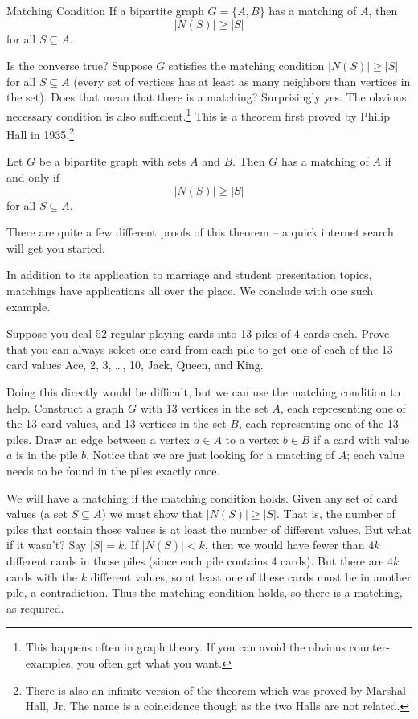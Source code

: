 \documentclass[12pt]{article}
\begin{document}
\begin{defbox}{Matching Condition}
If a bipartite graph $G = \{A, B\}$ has a matching of $A$, then 
\[|N(S)| \ge |S|\]
for all $S \subseteq A$.
\end{defbox}

Is the converse true?  Suppose $G$ satisfies the matching condition $|N(S)| \ge |S|$ for all $S \subseteq A$ (every set of vertices has at least as many neighbors than vertices in the set).  Does that mean that there is a matching?  Surprisingly yes.  The obvious necessary condition is also sufficient.\footnote{This happens often in graph theory.  If you can avoid the obvious counter-examples, you often get what you want.}  This is a theorem first proved by Philip Hall in 1935.\footnote{There is also an infinite version of the theorem which was proved by Marshal Hall, Jr.  The name is a coincidence though as the two Halls are not related.}

\begin{theorem}
Let $G$ be a bipartite graph with sets $A$ and $B$.  Then $G$ has a matching of $A$ if and only if
\[|N(S)| \ge |S|\]
for all $S \subseteq A$.
\end{theorem}

There are quite a few different proofs of this theorem -- a quick internet search will get you started.  

In addition to its application to marriage and student presentation topics, matchings have applications all over the place.  We conclude with one such example.

\begin{example}
Suppose you deal 52 regular playing cards into 13 piles of 4 cards each.  Prove that you can always select one card from each pile to get one of each of the 13 card values Ace, 2, 3, \ldots, 10, Jack, Queen, and King.

\begin{solution}
	Doing this directly would be difficult, but we can use the matching condition to help.  Construct a graph $G$ with 13 vertices in the set $A$, each representing one of the 13 card values, and 13 vertices in the set $B$, each representing one of the 13 piles.  Draw an edge between a vertex $a \in A$ to a vertex $b \in B$ if a card with value $a$ is in the pile $b$.  Notice that we are just looking for a matching of $A$; each value needs to be found in the piles exactly once.
	
	We will have a matching if the matching condition holds.  Given any set of card values (a set $S \subseteq A$) we must show that $|N(S)| \ge |S|$.  That is, the number of piles that contain those values is at least the number of different values. But what if it wasn't?  Say $|S| = k$.  If $|N(S)| < k$, then we would have fewer than $4k$ different cards in those piles (since each pile contains 4 cards).  But there are $4k$ cards with the $k$ different values, so at least one of these cards must be in another pile, a contradiction.  Thus the matching condition holds, so there is a matching, as required.
\end{solution}

\end{example}
\end{document}
